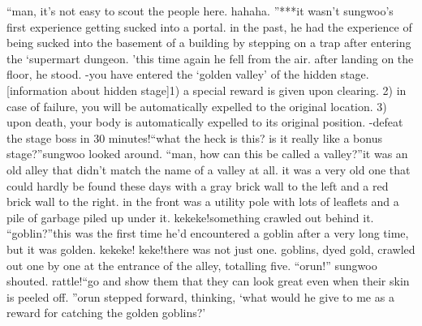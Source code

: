 “man, it’s not easy to scout the people here.
 hahaha.
”***it wasn’t sungwoo’s first experience getting sucked into a portal.
 in the past, he had the experience of being sucked into the basement of a building by stepping on a trap after entering the ‘supermart dungeon.
’this time again he fell from the air.
 after landing on the floor, he stood.
-you have entered the ‘golden valley’ of the hidden stage.
[information about hidden stage]1) a special reward is given upon clearing.
2) in case of failure, you will be automatically expelled to the original location.
3) upon death, your body is automatically expelled to its original position.
-defeat the stage boss in 30 minutes!“what the heck is this? is it really like a bonus stage?”sungwoo looked around.
“man, how can this be called a valley?”it was an old alley that didn’t match the name of a valley at all.
 it was a very old one that could hardly be found these days with a gray brick wall to the left and a red brick wall to the right.
in the front was a utility pole with lots of leaflets and a pile of garbage piled up under it.
kekeke!something crawled out behind it.
“goblin?”this was the first time he’d encountered a goblin after a very long time, but it was golden.
kekeke! keke!there was not just one.
 goblins, dyed gold, crawled out one by one at the entrance of the alley, totalling five.
“orun!” sungwoo shouted.
rattle!“go and show them that they can look great even when their skin is peeled off.
”orun stepped forward, thinking, ‘what would he give to me as a reward for catching the golden goblins?’

 